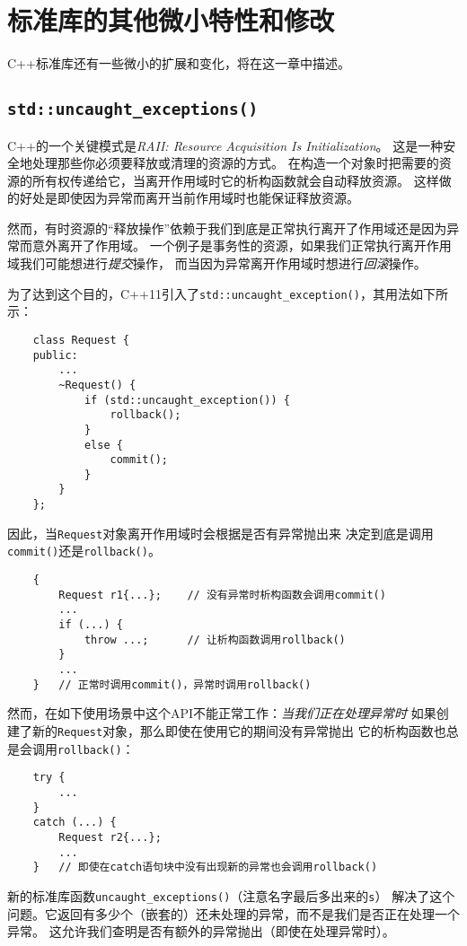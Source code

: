 \chapter{标准库的其他微小特性和修改}\label{ch28}
C++标准库还有一些微小的扩展和变化，将在这一章中描述。


\section{\texttt{std::uncaught\_exceptions()}}\label{ch28.1}
C++的一个关键模式是\emph{RAII: Resource Acquisition Is Initialization}。
这是一种安全地处理那些你必须要释放或清理的资源的方式。
在构造一个对象时把需要的资源的所有权传递给它，当离开作用域时它的析构函数就会自动释放资源。
这样做的好处是即使因为异常而离开当前作用域时也能保证释放资源。

然而，有时资源的“释放操作”依赖于我们到底是正常执行离开了作用域还是因为异常而意外离开了作用域。
一个例子是事务性的资源，如果我们正常执行离开作用域我们可能想进行\emph{提交}操作，
而当因为异常离开作用域时想进行\emph{回滚}操作。

为了达到这个目的，C++11引入了\texttt{std::uncaught\_exception()}，其用法如下所示：
\begin{lstlisting}
    class Request {
    public:
        ...
        ~Request() {
            if (std::uncaught_exception()) {
                rollback();
            }
            else {
                commit();
            }
        }
    };
\end{lstlisting}
因此，当\texttt{Request}对象离开作用域时会根据是否有异常抛出来
决定到底是调用\texttt{commit()}还是\texttt{rollback()}。
\begin{lstlisting}
    {
        Request r1{...};    // 没有异常时析构函数会调用commit()
        ...
        if (...) {
            throw ...;      // 让析构函数调用rollback()
        }
        ...
    }   // 正常时调用commit()，异常时调用rollback()
\end{lstlisting}
然而，在如下使用场景中这个API不能正常工作：\emph{当我们正在处理异常时}
如果创建了新的\texttt{Request}对象，那么即使在使用它的期间没有异常抛出
它的析构函数也总是会调用\texttt{rollback()}：
\begin{lstlisting}
    try {
        ...
    }
    catch (...) {
        Request r2{...};
        ...
    }   // 即使在catch语句块中没有出现新的异常也会调用rollback()
\end{lstlisting}
新的标准库函数\texttt{uncaught\_exceptions()}（注意名字最后多出来的\texttt{s}）
解决了这个问题。它返回有多少个（嵌套的）还未处理的异常，而不是我们是否正在处理一个异常。
这允许我们查明是否有额外的异常抛出（即使在处理异常时）。

